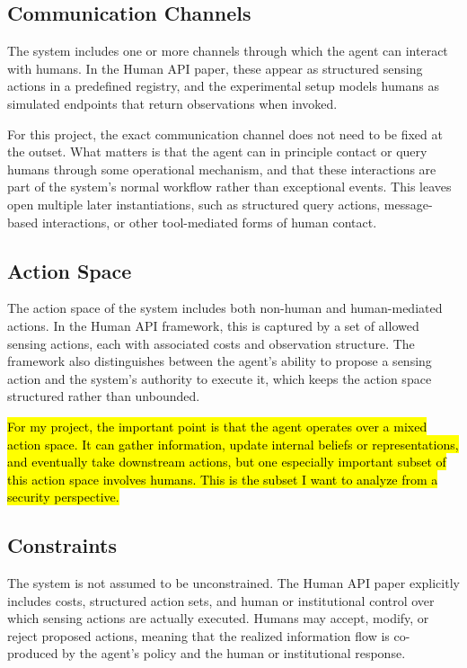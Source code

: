 \documentclass[11pt]{article}
\begin{document}
\subsection{Communication Channels}

The system includes one or more channels through which the agent can interact with humans. In the Human API paper, these appear as structured sensing actions in a predefined registry, and the experimental setup models humans as simulated endpoints that return observations when invoked. \citep{oliver2026humanapi}

For this project, the exact communication channel does not need to be fixed at the outset. What matters is that the agent can in principle contact or query humans through some operational mechanism, and that these interactions are part of the system's normal workflow rather than exceptional events. This leaves open multiple later instantiations, such as structured query actions, message-based interactions, or other tool-mediated forms of human contact.

\subsection{Action Space}

The action space of the system includes both non-human and human-mediated actions. In the Human API framework, this is captured by a set of allowed sensing actions, each with associated costs and observation structure. The framework also distinguishes between the agent's ability to propose a sensing action and the system's authority to execute it, which keeps the action space structured rather than unbounded. \citep{oliver2026humanapi}

\hl{For my project, the important point is that the agent operates over a mixed action space. It can gather information, update internal beliefs or representations, and eventually take downstream actions, but one especially important subset of this action space involves humans. This is the subset I want to analyze from a security perspective.}

\subsection{Constraints}

The system is not assumed to be unconstrained. The Human API paper explicitly includes costs, structured action sets, and human or institutional control over which sensing actions are actually executed. Humans may accept, modify, or reject proposed actions, meaning that the realized information flow is co-produced by the agent's policy and the human or institutional response. \citep{oliver2026humanapi}
\end{document}
